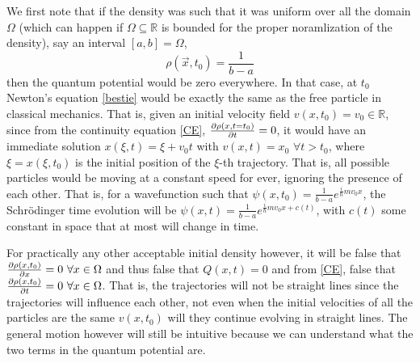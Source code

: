 \documentclass[11pt, a4paper]{article} %
\newcommand{\R}{\mathbb{R}} %
\begin{document}
We first note that if the density was such that it was uniform over all the domain $\Omega$ (which can happen if $\Omega\subseteq \R$ is bounded for the proper noramlization of the density), say an interval $[a,b]=\Omega$,
\begin{equation}
\rho(\vec{x},t_0)=\frac{1}{b-a}
\end{equation}
 then the quantum potential would be zero everywhere. In that case, at $t_0$ Newton's equation \eqref{bestie} would be exactly the same as the free particle in classical mechanics. That is, given an initial velocity field $v(x,t_0)=v_0\in\R$, since from the continuity equation \eqref{CE}, $\pdv{\rho(x,t=t_0)}{t}=0$, it would have an immediate solution $x(\xi,t)=\xi+v_0t$ with $v(x,t)=x_0$ $\forall t>t_0$, where $\xi=x(\xi,t_0)$ is the initial position of the $\xi$-th trajectory. That is, all possible particles would be moving at a constant speed for ever, ignoring the presence of each other. That is, for a wavefunction such that $\psi(x,t_0)=\frac{1}{b-a}e^{\frac{i}{\hbar}mv_0x}$, the Schrödinger time evolution will be $\psi(x,t)=\frac{1}{b-a}e^{\frac{i}{\hbar}mv_0x+c(t)}$, with $c(t)$ some constant in space that at most will change in time.
 
For practically any other acceptable initial density however, it will be false that $\pdv{\rho(x,t_0)}{x}= 0 \ \forall x\in\Omega$ and thus false that $Q(x,t)=0$ and from \eqref{CE}, false that $\pdv{\rho(x,t_0)}{t}= 0\ \forall x\in\Omega$. That is, the trajectories will not be straight lines since the trajectories will influence each other, not even when the initial velocities of all the particles are the same $v(x,t_0)$ will they continue evolving in straight lines. The general motion however will still be intuitive because we can understand what the two terms in the quantum potential are.
\end{document}
